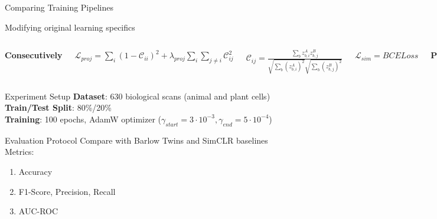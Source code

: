 \documentclass{beamer}
\begin{document}
\begin{frame}{Comparing Training Pipelines}
\begin{block}{Modifying original learning specifics}
    \begin{columns}
        \vspace{2mm}
        \begin{center}
            \textbf{Consecutively}
        \end{center}
        $ \mathcal{L}_{proj} = \sum_i(1 - \mathcal{C}_{ii})^2 + \lambda_{proj} \sum_i \sum_{j \neq i} \mathcal{C}_{ij}^2 $

        \vspace{3mm}
        
        $ \mathcal{C}_{ij} = \frac{\sum_b{z_{b,i}^A z_{b,j}^B}}{\sqrt{\sum_b{(z_{b,i}^A)^2}} \sqrt{\sum_b{(z_{b,j}^B)^2}}} $

        \vspace{3mm}
        
        $ \mathcal{L}_{sim} = BCELoss $
    
        \vspace{2mm}
        \begin{center}
            \textbf{Parallel}
        \end{center}
        $ \mathcal{L} = \mathcal{L}_{sim} + \lambda \cdot \mathcal{L}_{proj} $
    \end{columns}
\end{block}
\end{frame}


\begin{frame}{Experiment Setup}
    \textbf{Dataset}: 630 biological scans (animal and plant cells) \\
    \textbf{Train/Test Split}: 80\%/20\% \\
    \textbf{Training}: 100 epochs, AdamW optimizer ($\gamma_{start}=3\cdot10^{-3}, \gamma_{end}=5\cdot10^{-4}$)

\vspace{4mm}

\begin{block}{Evaluation Protocol}
    Compare with Barlow Twins and SimCLR baselines \\
    Metrics:
    \begin{enumerate}
        \item Accuracy 
        \item F1-Score, Precision, Recall
        \item AUC-ROC
    \end{enumerate}
\end{block}
\end{frame}
\end{document}
